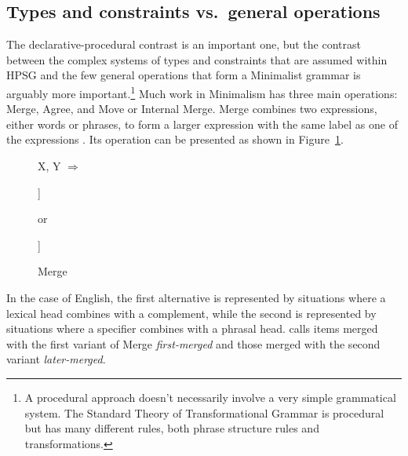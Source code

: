 \documentclass[output=paper
	        ,collection
	        ,collectionchapter
 	        ,biblatex
                ,babelshorthands
                ,newtxmath
                ,draftmode
                ,colorlinks, citecolor=brown
]{langscibook}
\begin{document}


\subsection{Types and constraints vs.\ general operations}
\label{sec-types-vs-operations}

The declarative-procedural contrast is an important one, but the contrast between the complex
systems of types and constraints that are assumed within HPSG and the few general operations that
form a Minimalist grammar is arguably more important.\footnote{%
  A procedural approach doesn't necessarily involve a very simple grammatical system. The Standard
  Theory of Transformational Grammar \citep{Chomsky65a} is procedural but has many different rules,
  both phrase structure rules and transformations.}
Much work in Minimalism has three main operations: Merge, Agree, and Move or Internal Merge. Merge
combines two expressions, either words or phrases, to form a larger expression with the same label
as one of the expressions \parencites[244]{Chomsky95a-u}[]{Chomsky2008a}. Its operation can be presented as shown in Figure~\ref{fig:min-merge}.
\begin{figure}
\centering
	X, Y $\Rightarrow$
	\hspace{1em}
	\begin{forest} %
		[X [X,baseline] [Y]]
	\end{forest}
\hspace{1em}
{or}
\hspace{1em}
	\begin{forest} %
		[Y [X,baseline] [Y]]
	\end{forest}
	\caption{\label{fig:min-merge}Merge}
\end{figure}
In the case of English, the first alternative is represented by situations where a lexical head
combines with a complement, while the second is represented by situations where a specifier combines
with a phrasal head. \citet[]{Chomsky2008a} calls items merged with the first variant of Merge \emph{first-merged}
and those merged with the second variant \emph{later-merged}.
\end{document}
